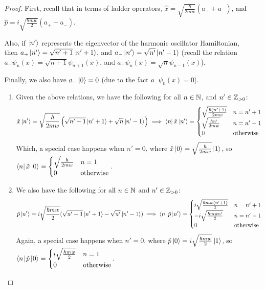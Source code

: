 \documentclass{article}
\begin{document}
\begin{proof}

    First, recall that in terms of ladder operators, $\hat{x}=\sqrt{\frac{\hbar}{2mw}}(a_++a_-)$, and $ \hat{p}=i\sqrt{\frac{\hbar mw}{2}}(a_+-a_-)$. 
    
    Also, if $\ket{n'}$ represents the eigenvector of the harmonic oscillator Hamiltonian, then $a_+\ket{n'}=\sqrt{n'+1}\ket{n'+1}$, and $a_-\ket{n'}=\sqrt{n'}\ket{n'-1}$ (recall the relation $a_+\psi_n(x)=\sqrt{n+1}\psi_{n+1}(x)$, and $a_-\psi_n(x)=\sqrt{n}\psi_{n-1}(x)$). 

    Finally, we also have $a_-\ket{0} = 0$ (due to the fact $a_-\psi_0(x)=0$).

    \begin{enumerate}
        \item Given the above relations, we have the following for all $n\in \mathbb{N}$, and $n'\in\mathbb{Z}_{>0}$:
        \begin{align}
            \hat{x}\ket{n'} = \sqrt{\frac{\hbar}{2mw}}\left(\sqrt{n'+1}\ket{n'+1}+\sqrt{n
            }\ket{n'-1}\right)\implies \bra{n}\hat{x}\ket{n'} = \begin{cases}
                \sqrt{\frac{\hbar(n'+1)}{2mw}} & n=n'+1\\
                \sqrt{\frac{\hbar n'}{2mw}} & n=n'-1\\
                0 & \text{otherwise}
            \end{cases}
        \end{align}
        Which, a special case happens when $n'=0$, where $\hat{x}\ket{0} =\sqrt{\frac{\hbar}{2mw}}\ket{1}$, so $\bra{n}\hat{x}\ket{0} = \begin{cases}
            \sqrt{\frac{\hbar}{2mw}} & n=1\\
            0 & \text{otherwise}
        \end{cases}$.

        \hfil

        \item We also have the following for all $n\in\mathbb{N}$ and $n'\in\mathbb{Z}_{>0}$:
        \begin{align}
            \hat{p}\ket{n'} = i\sqrt{\frac{\hbar mw}{2}}(\sqrt{n'+1}\ket{n'+1}-\sqrt{n'}\ket{n'-1})\implies \bra{n}\hat{p}\ket{n'} = \begin{cases}
                i\sqrt{\frac{\hbar mw(n'+1)}{2}} & n=n'+1\\
                -i\sqrt{\frac{\hbar mw n'}{2}} & n=n'-1\\
                0 & \text{otherwise}
            \end{cases}
        \end{align}
        Again, a special case happens when $n'=0$, where $\hat{p}\ket{0} = i\sqrt{\frac{\hbar mw}{2}}\ket{1}$, so $\bra{n}\hat{p}\ket{0} = \begin{cases}
            i\sqrt{\frac{\hbar mw}{2}} & n=1\\
            0 & \text{otherwise}
        \end{cases}$.


\end{enumerate}
\end{proof}
\end{document}
